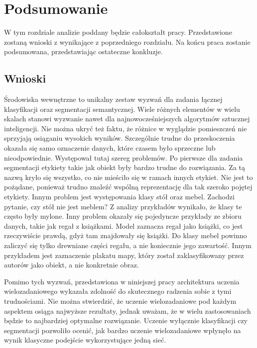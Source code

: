 \clearpage
\newpage %
\section{Podsumowanie}

W tym rozdziale analizie poddany będzie całokształt pracy. Przedstawione zostaną wnioski z wynikające z poprzedniego rozdziału. Na końcu praca zostanie podsumowana, przedstawiając ostateczne konkluzje.

\subsection{Wnioski}

Środowiska wewnętrzne to unikalny zestaw wyzwań dla zadania łącznej klasyfikacji oraz segmentacji semantycznej. Wiele różnych elementów w wielu skalach stanowi wyzwanie nawet dla najnowocześniejszych algorytmów sztucznej inteligencji. Nie można ukryć też faktu, że różnice w wyglądzie pomieszczeń nie sprzyjają osiąganiu wysokich wyników. Szczególnie trudne do przeskoczenia okazała się samo oznaczenie danych, które czasem było sprzeczne lub nieodpowiednie. Występował tutaj szereg problemów. Po pierwsze dla zadania segmentacji etykiety takie jak obiekt były bardzo trudne do rozwiązania. Za tą nazwą kryło się wszystko, co nie mieściło się w ramach innych etykiet. Nie jest to pożądane, ponieważ trudno znaleźć wspólną reprezentację dla tak szeroko pojętej etykiety. Innym problem jest występowania klasy stół oraz mebel. Zachodzi pytanie, czy stół nie jest meblem? Z analizy przykładów wynikało, że klasy te często były mylone. Inny problem okazały się pojedyncze przykłady ze zbioru danych, takie jak regał z książkami. Model zaznacza regał jako książki, co jest rzeczywiście prawdą, gdyż tam znajdowały się książki. Do klasy mebel powinno zaliczyć się tylko drewniane części regału, a nie koniecznie jego zawartość. Innym przykładem jest zaznaczenie plakatu mapy, który został zaklasyfikowany przez autorów jako obiekt, a nie konkretnie obraz.

Pomimo tych wyzwań, przedstawiona w niniejszej pracy architektura uczenia wielozadaniowego wykazała zdolność do skutecznego radzenia sobie z tymi trudnościami. Nie można stwierdzić, że uczenie wielozadaniowe pod każdym aspektem osiąga najwyższe rezultaty, jednak uważam, że w wielu zastosowaniach będzie to najbardziej optymalne rozwiązanie. Uczenie wyłącznie klasyfikacji czy segmentacji pozwoliło ocenić, jak bardzo uczenie wielozadaniowe wpłynęło na wynik klasyczne podejście wykorzystujące jedną sieć.

